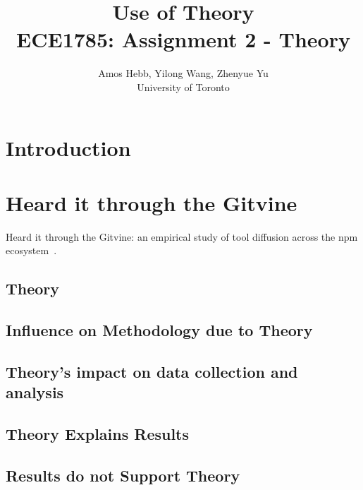 \documentclass[12pt]{IEEEtran}
\begin{document}
\title{Use of Theory\\
{\normalsize ECE1785: Assignment 2 - Theory}}

\author{Amos Hebb, Yilong Wang, Zhenyue Yu\\ \small University of Toronto}

\maketitle






\section{Introduction}

\section{Heard it through the {\sc Git}vine}

Heard it through the {\sc Git}vine: an empirical study of tool diffusion across the npm ecosystem~\cite{lamba2020heard}.

\subsection{Theory}

\subsection{Influence on Methodology due to Theory}

\subsection{Theory's impact on data collection and analysis}

\subsection{Theory Explains Results}
\subsection{Results do not Support Theory} %
\end{document}
